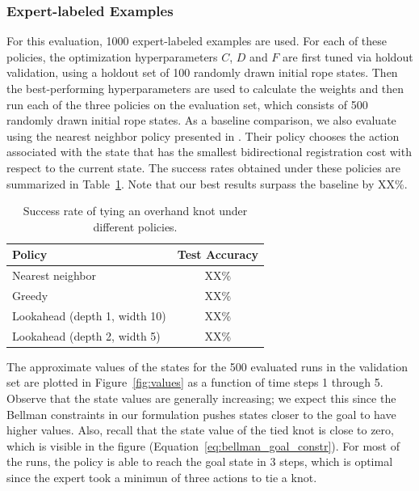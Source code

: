 \subsubsection{Expert-labeled Examples}
For this evaluation, 1000 expert-labeled examples are used.
For each of these policies, the optimization hyperparameters $C$, $D$ and $F$ are first tuned via holdout validation, using a holdout set of 100 randomly drawn initial rope states.
Then the best-performing hyperparameters are used to calculate the weights and then run each of the three policies on the evaluation set, which consists of 500 randomly drawn initial rope states.
As a baseline comparison, we also evaluate using the nearest neighbor policy presented in \citet{Schulmanetal_ISRR2013}.
Their policy chooses the action associated with the state that has the smallest bidirectional registration cost with respect to the current state.
The success rates obtained under these policies are summarized in Table~\ref{table:performance}. Note that our best results surpass the baseline by XX\%.

\begin{table}
  \centering
  \begin{tabular}{lc}
    \toprule
      Policy & Test Accuracy\\
    \midrule
      Nearest neighbor \cite{Schulmanetal_ISRR2013} & XX\% \\
    \midrule
      Greedy & XX\% \\
      Lookahead (depth 1, width 10) & XX\% \\
      Lookahead (depth 2, width 5) & XX\% \\
    \bottomrule
  \end{tabular}
  \caption{Success rate of tying an overhand knot under different policies.}
  \label{table:performance}
\end{table}

The approximate values of the states for the 500 evaluated runs in the validation set are plotted in Figure~\ref{fig:values} as a function of time steps 1 through 5.
Observe that the state values are generally increasing; we expect this since the Bellman constraints in our formulation pushes states closer to the goal to have higher values.
Also, recall that the state value of the tied knot is close to zero, which is visible in the figure (Equation~\ref{eq:bellman_goal_constr}).
For most of the runs, the policy is able to reach the goal state in 3 steps, which is optimal since the expert took a minimun of three actions to tie a knot.

